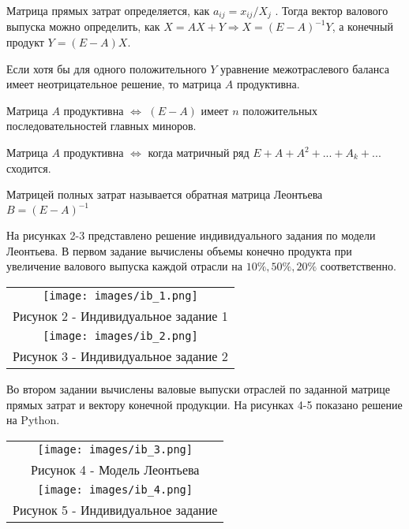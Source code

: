 Матрица прямых затрат определяется, как $a_{ij}=x_{ij}/X_j$ . Тогда вектор валового выпуска можно определить,
 как $X=AX+Y\Rightarrow X=(E-A)^{-1} Y$, а конечный продукт $Y=(E-A)X$.

 \begin{definition}
   Если хотя бы для одного положительного $Y$ уравнение межотраслевого баланса имеет неотрицательное решение, то матрица $A$ продуктивна.
 \end{definition}
 \begin{definition}
  Матрица $A$ продуктивна $\iff$ $(E-A)$ имеет $n$ положительных последовательностей главных миноров.
 \end{definition}
 \begin{definition}
  Матрица $A$ продуктивна $\iff$ когда матричный ряд $E+A+A^2+...+A_k+...$ сходится.
 \end{definition}
 \begin{definition}
  Матрицей полных затрат называется обратная матрица Леонтьева $B=(E-A)^{-1}$
 \end{definition}

На рисунках 2-3 представлено решение индивидуального задания по модели Леонтьева. В первом задание вычислены объемы конечно продукта при увеличение валового выпуска каждой отрасли на $10\%,50\%,20\%$ соответственно.
 \begin{center}
   \begin{tabular}{c}
     \texttt{[image: images/ib\_1.png]}\\
     Рисунок 2 - Индивидуальное задание 1\\
     \texttt{[image: images/ib\_2.png]}\\
     Рисунок 3 - Индивидуальное задание 2
   \end{tabular}
 \end{center}
 
Во втором задании вычислены валовые выпуски отраслей по заданной матрице прямых затрат и вектору конечной продукции.
На рисунках 4-5 показано решение на Python.
\begin{center}
  \begin{tabular}{c}
    \texttt{[image: images/ib\_3.png]}\\
    Рисунок 4 - Модель Леонтьева\\
    \texttt{[image: images/ib\_4.png]}\\
    Рисунок 5 - Индивидуальное задание
  \end{tabular}
\end{center}
% 
